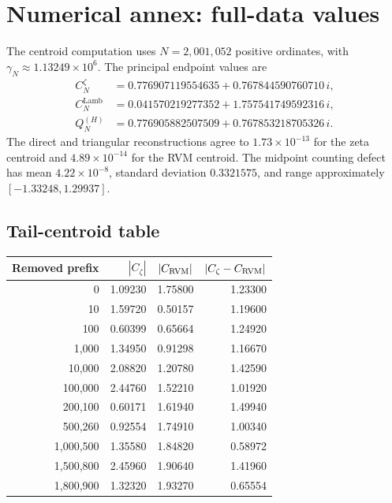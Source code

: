 \documentclass[11pt]{amsart}
\numberwithin{equation}{section}
\theoremstyle{definition}
\theoremstyle{remark}
\begin{document}
\appendix

\section{Numerical annex: full-data values}\label{sec:numerical_annex}
The centroid computation uses $N=2{,}001{,}052$ positive ordinates, with $\gamma_N\approx1.13249\times10^6$. The principal endpoint values are
\begin{align}
C_N^{\zeta}
&=0.776907119554635+0.767844590760710\,i,
\label{eq:annex_Czeta}\\
C_N^{\mathrm{Lamb}}
&=0.041570219277352+1.757541749592316\,i,
\label{eq:annex_CRVM}\\
Q_N^{(H)}
&=0.776905882507509+0.767853218705326\,i.
\label{eq:annex_QH}
\end{align}
The direct and triangular reconstructions agree to $1.73\times10^{-13}$ for the zeta centroid and $4.89\times10^{-14}$ for the RVM centroid. The midpoint counting defect has mean $4.22\times10^{-8}$, standard deviation $0.3321575$, and range approximately $[-1.33248,1.29937]$.

\subsection{Tail-centroid table}\label{subsec:annex_tail_centroid}
\begin{center}
\small
\begin{tabular}{rrrr}
\toprule
Removed prefix & $|C_\zeta|$ & $|C_{\rm RVM}|$ & $|C_\zeta-C_{\rm RVM}|$\\
\midrule
0 & 1.09230 & 1.75800 & 1.23300\\
10 & 1.59720 & 0.50157 & 1.19600\\
100 & 0.60399 & 0.65664 & 1.24920\\
1,000 & 1.34950 & 0.91298 & 1.16670\\
10,000 & 2.08820 & 1.20780 & 1.42590\\
100,000 & 2.44760 & 1.52210 & 1.01920\\
200,100 & 0.60171 & 1.61940 & 1.49940\\
500,260 & 0.92554 & 1.74910 & 1.00340\\
1,000,500 & 1.35580 & 1.84820 & 0.58972\\
1,500,800 & 2.45960 & 1.90640 & 1.41960\\
1,800,900 & 1.32320 & 1.93270 & 0.65554\\
\bottomrule
\end{tabular}
\end{center}
\end{document}
